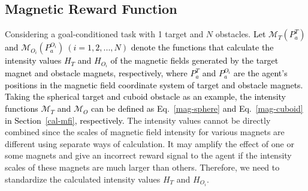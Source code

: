 \documentclass[journal]{IEEEtran}
\begin{document}
\subsection{Magnetic Reward Function}\label{mag-srf}
Considering a goal-conditioned task with 1 target and $N$ obstacles. 
\textcolor{black}{
Let $\mathcal{M}_{T}(P_a^{T})$ and $\mathcal{M}_{O_i}(P_a^{O_i}) \ (i=1,2,...,N)$ denote the functions that calculate the intensity values $H_{T}$ and $H_{O_i}$ of the magnetic fields generated by the target magnet and obstacle magnets, respectively, where $P_a^T$ and $P_a^{O_i}$ are the agent's positions in the magnetic field coordinate system of target and obstacle magnets. 
Taking the spherical target and cuboid obstacle as an example, the intensity functions $\mathcal{M}_{T}$ and $\mathcal{M}_{O}$ can be defined as Eq.~\ref{mag-sphere} and Eq.~\ref{mag-cuboid} in Section~\ref{cal-mfi}, respectively.}
The intensity values cannot be directly combined since the scales of magnetic field intensity for various magnets are different using separate ways of calculation. 
It may amplify the effect of one or some magnets and give an incorrect reward signal to the agent if the intensity scales of these magnets are much larger than others. 
Therefore, we need to standardize the calculated intensity values $H_{T}$ and $H_{O_i}$.
\end{document}
